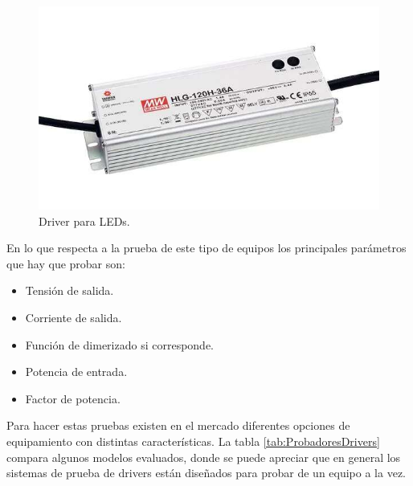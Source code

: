 \begin{figure}[ht]
	\centering
	\includegraphics[scale=.3]{./Figures/Driver.jpg}
	\caption{Driver para LEDs.}
	\label{fig:Driver}
\end{figure}


En lo que respecta a la prueba de este tipo de equipos los principales parámetros que hay que probar son:
\begin{itemize}
	\item Tensión de salida.
	\item Corriente de salida.
	\item Función de dimerizado si corresponde.
	\item Potencia de entrada.
	\item Factor de potencia.
\end{itemize}

	Para hacer estas pruebas existen en el mercado diferentes opciones  de equipamiento con distintas características. La tabla \ref{tab:ProbadoresDrivers} compara algunos modelos evaluados, donde se puede apreciar que en general los sistemas de prueba de drivers están diseñados para probar de un equipo a la vez.
	

